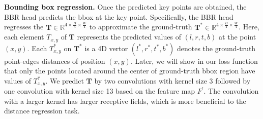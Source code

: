 \documentclass{article}
\begin{document}
\textbf{Bounding box regression.}
\label{subsec:bounding-box-regression}
Once the predicted key points are obtained, the BBR head predicts the bbox at the key point. Specifically, the BBR head regresses the $ \bm{T} \in \mathbb{R}^{4 \times \frac{H}{4} \times \frac{W}{4}}$ to approximate the ground-truth $\bm{T}^* \in \mathbb{R}^{4 \times \frac{H}{4} \times \frac{W}{4}}$. Here, each element ${T}_{x,y}$ of $\bm{T}$ represents the predicted values of $(l,r,t,b)$ at the point $(x,y)$. Each $ {T}^*_{x,y}$ on $ \bm{T}^*$ is a 4D vertor $(l^*,r^*,t^*,b^*)$ denotes the ground-truth point-edges distances of position $(x,y)$. 
Later, we will show in our loss function that only the points located around the center of ground-truth bbox region have values of $ {T}^*_{x,y}$. We predict $ \bm{T}$ by two convolutions with kernel size 3 followed by one convolution with kernel size 13 based on the feature map $F^{\prime}$. The convolution with a larger kernel has larger receptive fields, which is more beneficial to the distance regression task. \par




\vspace{-12pt}
\end{document}
